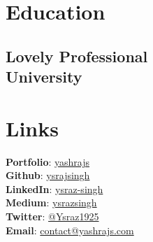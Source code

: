 \documentclass[]{deedy-resume-openfont}
\begin{document}
    \renewcommand{\baselinestretch}{1.08}

    


    \begin{minipage}[t]{0.33\textwidth} 


    \section{Education}  

    \subsection{Lovely Professional \\ University}  
    \sectionsep  



    \section{Links} 
    \textbf{Portfolio}: \href{http://yashrajs.com/}{yashrajs} \\
    \textbf{Github}: \href{https://github.com/ysrajsingh}{ysrajsingh} \\
    \textbf{LinkedIn}: \href{https://www.linkedin.com/in/ysraz-singh/}{ysraz-singh} \\
    \textbf{Medium}: \href{https://ysrazsingh.medium.com/}{ysrazsingh} \\
    \textbf{Twitter}: \href{https://x.com/Ysraz1925}{@Ysraz1925} \\
    \textbf{Email}: \href{mailto:contact@yashrajs.com}{contact@yashrajs.com}



\end{minipage}
\end{document}
